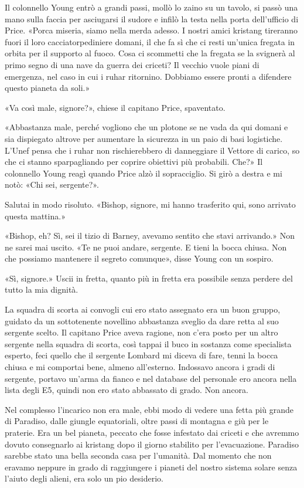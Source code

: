 Il colonnello Young entrò a grandi passi, mollò lo zaino su un tavolo,
si passò una mano sulla faccia per asciugarsi il sudore e infilò la
testa nella porta dell'ufficio di Price. «Porca miseria, siamo nella
merda adesso. I nostri amici kristang tireranno fuori il loro
cacciatorpediniere domani, il che fa sì che ci resti un'unica fregata in
orbita per il supporto al fuoco. Cosa ci scommetti che la fregata se la
svignerà al primo segno di una nave da guerra dei criceti? Il vecchio
vuole piani di emergenza, nel caso in cui i ruhar ritornino. Dobbiamo
essere pronti a difendere questo pianeta da soli.»

«Va così male, signore?», chiese il capitano Price, spaventato.

«Abbastanza male, perché vogliono che un plotone se ne vada da qui
domani e sia dispiegato altrove per aumentare la sicurezza in un paio di
basi logistiche. L'Unef pensa che i ruhar non rischierebbero di
danneggiare il Vettore di carico, so che ci stanno sparpagliando per
coprire obiettivi più probabili. Che?» Il colonnello Young reagì quando
Price alzò il sopracciglio. Si girò a destra e mi notò: «Chi sei,
sergente?».

Salutai in modo risoluto. «Bishop, signore, mi hanno trasferito qui,
sono arrivato questa mattina.»

«Bishop, eh? Sì, sei il tizio di Barney, avevamo sentito che stavi
arrivando.» Non ne sarei mai uscito. «Te ne puoi andare, sergente. E
tieni la bocca chiusa. Non che possiamo mantenere il segreto comunque»,
disse Young con un sospiro.

«Sì, signore.» Uscii in fretta, quanto più in fretta era possibile senza
perdere del tutto la mia dignità.

\hfill\break

La squadra di scorta ai convogli cui ero stato assegnato era un buon
gruppo, guidato da un sottotenente novellino abbastanza sveglio da dare
retta al suo sergente scelto. Il capitano Price aveva ragione, non c'era
posto per un altro sergente nella squadra di scorta, così tappai il buco
in sostanza come specialista esperto, feci quello che il sergente
Lombard mi diceva di fare, tenni la bocca chiusa e mi comportai bene,
almeno all'esterno. Indossavo ancora i gradi di sergente, portavo
un'arma da fianco e nel database del personale ero ancora nella lista
degli E5, quindi non ero stato abbassato di grado. Non ancora.

Nel complesso l'incarico non era male, ebbi modo di vedere una fetta più
grande di Paradiso, dalle giungle equatoriali, oltre passi di montagna e
giù per le praterie. Era un bel pianeta, peccato che fosse infestato dai
criceti e che avremmo dovuto consegnarlo ai kristang dopo il giorno
stabilito per l'evacuazione. Paradiso sarebbe stato una bella seconda
casa per l'umanità. Dal momento che non eravamo neppure in grado di
raggiungere i pianeti del nostro sistema solare senza l'aiuto degli
alieni, era solo un pio desiderio.

